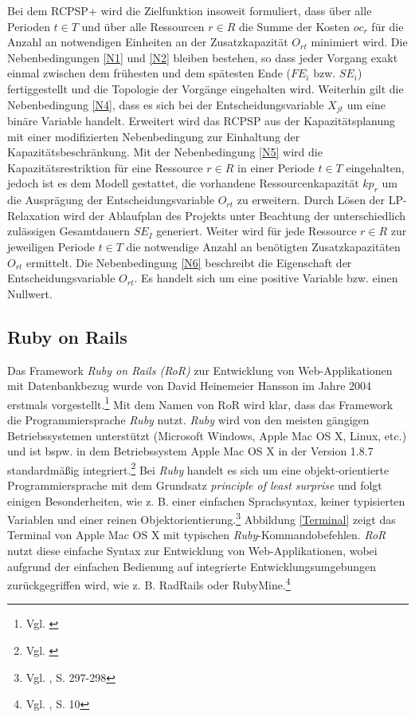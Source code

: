 \documentclass[a4paper,12pt,parskip,bibtotoc,liststotoc]{article}
\begin{document}
Bei dem RCPSP+ wird die Zielfunktion insoweit formuliert, dass über alle Perioden $t\in T$ und über alle Ressourcen $r\in R$ die Summe der Kosten $oc_r$ für die Anzahl an notwendigen Einheiten an der Zusatzkapazität $O_{rt}$ minimiert wird. Die Nebenbedingungen \eqref{N1} und \eqref{N2} bleiben bestehen, so dass jeder Vorgang exakt einmal zwischen dem frühesten und dem spätesten Ende ($FE_i$ bzw. $SE_i$) fertiggestellt und die Topologie der Vorgänge eingehalten wird. Weiterhin gilt die Nebenbedingung \eqref{N4}, dass es sich bei der Entscheidungsvariable $X_{jt}$ um eine binäre Variable handelt. Erweitert wird das RCPSP aus der Kapazitätsplanung mit einer modifizierten Nebenbedingung zur Einhaltung der Kapazitätsbeschränkung. Mit der Nebenbedingung \eqref{N5} wird die Kapazitätsrestriktion für eine Ressource $r\in R$ in einer Periode $t\in T$ eingehalten, jedoch ist es dem Modell gestattet, die vorhandene Ressourcenkapazität $kp_r$ um die Ausprägung der Entscheidungsvariable $O_{rt}$ zu erweitern. Durch Lösen der LP-Relaxation wird der Ablaufplan des Projekts unter Beachtung der unterschiedlich zulässigen Gesamtdauern $SE_I$ generiert. Weiter wird für jede Ressource $r\in R$ zur jeweiligen Periode $t\in T$ die notwendige Anzahl an benötigten Zusatzkapazitäten $O_{rt}$ ermittelt. Die Nebenbedingung \eqref{N6} beschreibt die Eigenschaft der Entscheidungsvariable $O_{rt}$. Es handelt sich um eine positive Variable bzw. einen Nullwert.

\subsection{Ruby on Rails}
Das Framework \textit{Ruby on Rails (RoR)} zur Entwicklung von Web-Applikationen mit Datenbankbezug wurde von David Heinemeier Hansson im Jahre 2004 erstmals vorgestellt.\footnote{Vgl. \cite{ruby2004}} Mit dem Namen von RoR wird klar, dass das Framework die Programmiersprache \textit{Ruby} nutzt. \textit{Ruby} wird von den meisten gängigen Betriebssystemen unterstützt (Microsoft Windows, Apple Mac OS X, Linux, etc.) und ist bspw. in dem Betriebssystem Apple Mac OS X in der Version 1.8.7 standardmäßig integriert.\footnote{Vgl. \cite{ruby-schienen}} Bei \textit{Ruby} handelt es sich um eine objekt-orientierte Programmiersprache mit dem Grundsatz \textit{principle of least surprise} und folgt einigen Besonderheiten, wie z. B. einer einfachen Sprachsyntax, keiner typisierten Variablen und einer reinen Objektorientierung.\footnote{Vgl. \cite{Walter:2008aa}, S. 297-298} Abbildung \ref{Terminal} zeigt das Terminal von Apple Mac OS X mit typischen \textit{Ruby}-Kommandobefehlen. \textit{RoR} nutzt diese einfache Syntax zur Entwicklung von Web-Applikationen, wobei aufgrund der einfachen Bedienung auf integrierte Entwicklungsumgebungen zurückgegriffen wird, wie z. B. RadRails oder RubyMine.\footnote{Vgl. \cite{hartl2012ruby}, S. 10} \\
\end{document}
